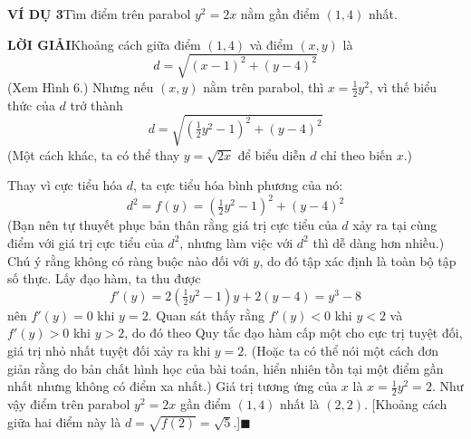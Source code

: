 \documentclass[11pt,twoside]{article}
\begin{document}
\begin{minipage}[t]{0.71\textwidth}
  \vspace{1.0em}
  \noindent
  \textbf{\textsf{\color{stewartcyan}VÍ DỤ 3}}\hspace{0.8em}Tìm điểm trên parabol $y^2 = 2x$ nằm gần điểm $(1, 4)$ nhất.
  \par\vspace{0.3em}
  \noindent
  \textbf{\textsf{\color{stewartcyan}LỜI GIẢI}}\hspace{0.8em}Khoảng cách giữa điểm $(1, 4)$ và điểm $(x, y)$ là
  \begin{equation*}
    d = \sqrt{(x - 1)^2 + (y - 4)^2}
  \end{equation*}
  (Xem Hình 6.) Nhưng nếu $(x, y)$ nằm trên parabol, thì $x = \frac{1}{2}y^2$, vì thế biểu thức của $d$ trở thành
  \begin{equation*}
    d = \sqrt{\left(\tfrac{1}{2}y^2 - 1\right)^2 + (y - 4)^2}
  \end{equation*}
  (Một cách khác, ta có thể thay $y = \sqrt{2x}$ để biểu diễn $d$ chỉ theo biến $x$.)\par
  Thay vì cực tiểu hóa $d$, ta cực tiểu hóa bình phương của nó:
  \begin{equation*}
    d^2 = f(y) = \left(\tfrac{1}{2}y^2 - 1\right)^2 + (y - 4)^2
  \end{equation*}
  (Bạn nên tự thuyết phục bản thân rằng giá trị cực tiểu của $d$ xảy ra tại cùng điểm với giá trị cực tiểu của $d^2$, nhưng làm việc với $d^2$ thì dễ dàng hơn nhiều.) Chú ý rằng không có ràng buộc nào đối với $y$, do đó tập xác định là toàn bộ tập số thực. Lấy đạo hàm, ta thu được
  \begin{equation*}
    f'(y) = 2\left(\tfrac{1}{2}y^2 - 1\right)y + 2(y - 4) = y^3 - 8
  \end{equation*}
  nên $f'(y) = 0$ khi $y = 2$. Quan sát thấy rằng $f'(y) < 0$ khi $y < 2$ và $f'(y) > 0$ khi $y > 2$, do đó theo Quy tắc đạo hàm cấp một cho cực trị tuyệt đối, giá trị nhỏ nhất tuyệt đối xảy ra khi $y = 2$. (Hoặc ta có thể nói một cách đơn giản rằng do bản chất hình học của bài toán, hiển nhiên tồn tại một điểm gần nhất nhưng không có điểm xa nhất.) Giá trị tương ứng của $x$ là $x = \frac{1}{2}y^2 = 2$. Như vậy điểm trên parabol $y^2 = 2x$ gần điểm $(1, 4)$ nhất là $(2, 2)$. [Khoảng cách giữa hai điểm này là $d = \sqrt{f(2)} = \sqrt{5}$.]\hfill{\color{stewartcyan}$\blacksquare$}
\end{minipage}
\end{document}
